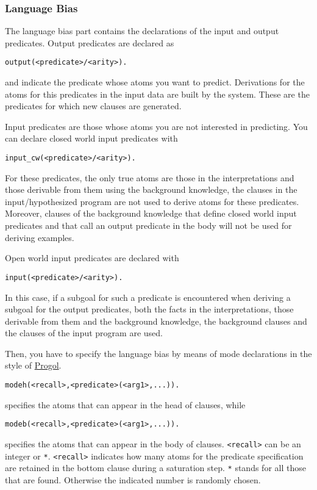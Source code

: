 \subsubsection{Language Bias}
%
The language bias part contains the declarations of the input and output predicates.
Output predicates are declared as
\begin{verbatim}
output(<predicate>/<arity>).
\end{verbatim}
and indicate the predicate whose atoms you want to predict. Derivations for the atoms for this predicates in the input data
are built by the system. These are the predicates for which new clauses are generated.

Input predicates are those whose atoms you are not interested in predicting. You can declare closed world input predicates with
\begin{verbatim}
input_cw(<predicate>/<arity>).
\end{verbatim}
For these predicates, the only true atoms are those in the interpretations and those derivable from them using the background knowledge, the clauses in the input/hypothesized program are not used to derive atoms for these predicates. Moreover,   clauses of the background knowledge that define closed world input predicates and that call an output predicate in the body will not be used for deriving examples.

Open world input predicates are declared with
\begin{verbatim}
input(<predicate>/<arity>).
\end{verbatim}
In this case, if a subgoal for such a predicate is encountered when deriving a subgoal for the output predicates, 
both the facts in the interpretations, those derivable from them and the background knowledge, the background clauses and the clauses of the input program are used.

Then, you have to specify the language bias by means of mode declarations in the style of 
\href{http://www.doc.ic.ac.uk/\string ~shm/progol.html}{Progol}.
\begin{verbatim}
modeh(<recall>,<predicate>(<arg1>,...)).
\end{verbatim}
specifies the atoms that can appear in the head of clauses, while
\begin{verbatim}
modeb(<recall>,<predicate>(<arg1>,...)).
\end{verbatim}
specifies the atoms that can appear in the body of clauses.
\texttt{<recall>} can be an integer or \texttt{*}.
\texttt{<recall>} indicates how many atoms for the predicate specification are
retained in the bottom clause during a saturation step. \texttt{*} stands for all those that are found. Otherwise the indicated number is randomly chosen.

